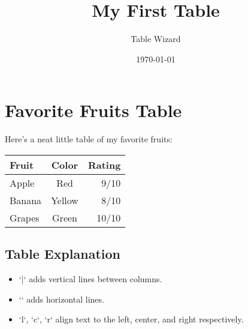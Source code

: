 \documentclass{article}
\title{My First Table}
\author{Table Wizard}
\date{\today}
\begin{document}
\maketitle

\section{Favorite Fruits Table}

Here’s a neat little table of my favorite fruits:

\begin{center}
\begin{tabular}{|l|c|r|}
\hline
Fruit & Color & Rating \\
\hline
Apple & Red & 9/10 \\
Banana & Yellow & 8/10 \\
Grapes & Green & 10/10 \\
\hline
\end{tabular}
\end{center}

\subsection*{Table Explanation}
\begin{itemize}
    \item `|` adds vertical lines between columns.
    \item `\hline` adds horizontal lines.
    \item `l`, `c`, `r` align text to the left, center, and right respectively.
\end{itemize}
\end{document}
